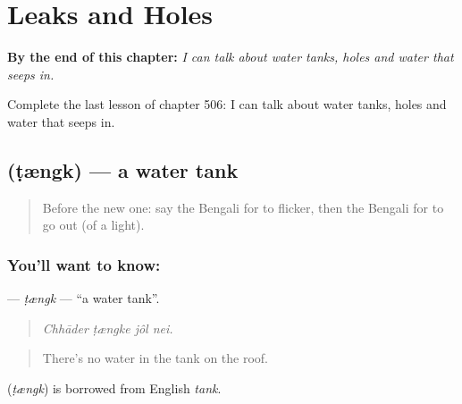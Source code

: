 
\chapter{Leaks and Holes}
\label{ch:bn-leaks-and-holes}

\begin{chapteropening}
\textbf{By the end of this chapter:} \emph{I can talk about water tanks, holes and water that seeps in.}

Complete the last lesson of chapter 506: I can talk about water tanks, holes and water that seeps in.
\end{chapteropening}

\section[\texorpdfstring{\bn{ট্যাংক} (ṭængk)}{ট্যাংক (ṭængk)}]{ (ṭængk) — a water tank}

\label{lesson:BN-C506-tengk}



\begin{quote}
Before the new one: say the Bengali for to flicker, then the Bengali for to go out (of a light).
\end{quote}

\subsection*{You'll want to know: }
\textbf{} — \emph{ṭængk} — \textquotedblleft{}a water tank\textquotedblright{}.

\begin{quote}
   
\end{quote}

\begin{quote}
\emph{Chhāder ṭængke jôl nei.}
\end{quote}

\begin{quote}
There's no water in the tank on the roof.
\end{quote}

\begin{cousinweb}
\textbf{} (\emph{ṭængk}) is borrowed from English \emph{tank}.
\end{cousinweb}

